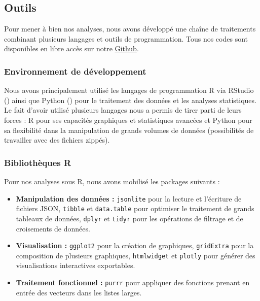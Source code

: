 \documentclass[a4paper,12pt]{article}
\begin{document}

\subsection{Outils}

Pour mener à bien nos analyses, nous avons développé une chaîne de traitements combinant plusieurs langages et outils de programmation. Tous nos codes sont disponibles en libre accès sur notre \href{https://github.com/lcletz/PLANTNET_M1_SSD}{Github}.

\subsubsection{Environnement de développement}

Nous avons principalement utilisé les langages de programmation R via RStudio (\cite{RStudio}) ainsi que Python (\cite{Python}) pour le traitement des données et les analyses statistiques. Le fait d'avoir utilisé plusieurs langages nous a permis de tirer parti de leurs forces : R pour ses capacités graphiques et statistiques avancées et Python pour sa flexibilité dans la manipulation de grands volumes de données (possibilités de travailler avec des fichiers zippés).

\subsubsection{Bibliothèques R}

Pour nos analyses sous R, nous avons mobilisé les packages suivants :
\begin{itemize}
    \item \textbf{Manipulation des données :} \texttt{jsonlite} pour la lecture et l'écriture de fichiers JSON, \texttt{tibble} et \texttt{data.table} pour optimiser le traitement de grands tableaux de données, \texttt{dplyr} et \texttt{tidyr} pour les opérations de filtrage et de croisements de données.
    \item \textbf{Visualisation :} \texttt{ggplot2} pour la création de graphiques, \texttt{gridExtra} pour la composition de plusieurs graphiques, \texttt{htmlwidget} et \texttt{plotly} pour générer des visualisations interactives exportables.
    \item \textbf{Traitement fonctionnel :} \texttt{purrr} pour appliquer des fonctions prenant en entrée des vecteurs dans les listes larges.
\end{itemize}
\end{document}
